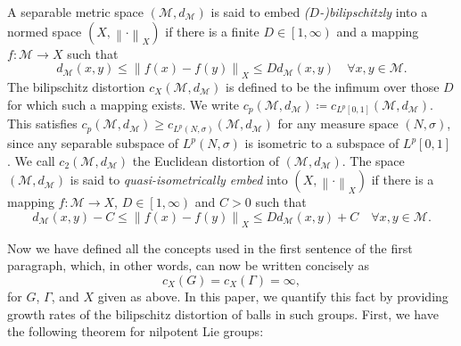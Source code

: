\documentclass[11pt,reqno]{amsart}
\newcommand{\1}{\mathbf 1}
\begin{document}
A separable metric space $\left({\mathcal{M}},d_{\mathcal{M}}\right)$ is said to embed \emph{($D$-)bilipschitzly} into a normed space $\left(X,\left\|\cdot\right\|_X\right)$ if there is a finite $D\in \left[1,\infty\right)$ and a mapping $f:{\mathcal{M}}\to X$ such that
\[
d_{\mathcal{M}}\left(x,y\right)\le \left\|f\left(x\right)-f\left(y\right)\right\|_X\le D d_{\mathcal{M}}\left(x,y\right) \quad \forall x,y\in {\mathcal{M}}.
\]
The bilipschitz distortion $c_X\left({\mathcal{M}},d_{\mathcal{M}}\right)$ is defined to be the infimum over those $D$ for which such a mapping exists. We write $c_p\left({\mathcal{M}},d_{\mathcal{M}}\right)\coloneqq c_{L^p\left[0,1\right]}\left({\mathcal{M}},d_{\mathcal{M}}\right)$. This satisfies $c_p\left({\mathcal{M}},d_{\mathcal{M}}\right)\ge c_{L^p\left(N,\sigma\right)}\left({\mathcal{M}},d_{\mathcal{M}}\right)$ for any measure space $\left(N,\sigma\right)$, since any separable subspace of $L^p\left(N,\sigma\right)$ is isometric to a subspace of $L^p\left[0,1\right]$ \cite[Fact 1.20]{ostrovskii2013metric}. We call $c_2\left({\mathcal{M}},d_{\mathcal{M}}\right)$ the Euclidean distortion of $\left({\mathcal{M}},d_{\mathcal{M}}\right)$. The space $\left({\mathcal{M}},d_{\mathcal{M}}\right)$ is said to \emph{quasi-isometrically embed} into $\left(X,\left\|\cdot\right\|_X\right)$ if there is a mapping $f:{\mathcal{M}}\to X$, $D\in \left[1,\infty\right)$ and $C>0$ such that
\[
d_{\mathcal{M}}\left(x,y\right)-C \le \left\|f\left(x\right)-f\left(y\right)\right\|_X\le D d_{\mathcal{M}}\left(x,y\right)+C\quad \forall x,y\in {\mathcal{M}}.
\]

Now we have defined all the concepts used in the first sentence of the first paragraph, which, in other words, can now be written concisely as
\[
c_X\left(G\right)=c_X\left(\Gamma\right)=\infty,
\]
for $G$, $\Gamma$, and $X$ given as above. In this paper, we quantify this fact by providing growth rates of the bilipschitz distortion of balls in such groups. First, we have the following theorem for nilpotent Lie groups:
\end{document}
